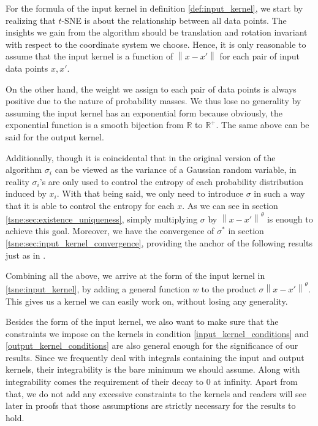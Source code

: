 \documentclass[10pt]{article}
\newcommand{\norm}[1]{\left\lVert#1\right\rVert}
\newenvironment{Proof of lemma}{\noindent{\bf Proof of Lemma}}{\hfill$\Box$\newline}
\newenvironment{Proof of claim}{\noindent{\bf Proof of claim}}{\hfill$\Box$\newline}
\newenvironment{Proof of theorem}{\noindent{\bf Proof of Theorem}}{\hfill\scriptsize{$\Box$}\newline}
\newenvironment{Proof of theorems}{\noindent{\bf Proof of Theorems}}{\hfill$\Box$\newline}
\newenvironment{Proof of proposition}{\noindent{\bf Proof of Proposition}}{\hfill$\Box$\newline}
\newenvironment{Proof of propositions}{\noindent{\bf Proof of Propositions}}{\hfill$\Box$\newline}
\newenvironment{Proof of exercise}{\noindent{\it Proof of Exercise:}}{\hfill$\Box$}
\numberwithin{equation}{section}
\begin{document}
For the formula of the input kernel in definition \ref{def:input_kernel}, we
start by realizing that $t$-SNE is about the relationship between all data
points. The insights we gain from the algorithm should be translation and
rotation invariant with respect to the coordinate system we choose. Hence, it
is only reasonable to assume that the input kernel is a function of
$\norm{x-x'}$ for each pair of input data points $x,x'$.

On the other hand, the weight we assign to each pair of data points is always
positive due to the nature of probability masses. We thus lose no generality by
assuming the input kernel has an exponential form because obviously, the
exponential function is a smooth bijection from $\mathbb{R}$ to $\mathbb{R}^+$.
The same above can be said for the output kernel.

Additionally, though it is coincidental that in the original version of the
algorithm $\sigma_i$ can be viewed as the variance of a Gaussian random
variable, in reality $\sigma_i$'s are only used to control the entropy of each
probability distribution induced by $x_i$. With that being said, we only need
to introduce $\sigma$ in such a way that it is able to control the entropy for
each $x$. As we can see in section \ref{tsne:sec:existence_uniqueness}, simply
multiplying $\sigma$ by $\norm{x-x'}^{\theta}$ is enough to achieve this goal.
Moreover, we have the convergence of $\sigma^*$ in section
\ref{tsne:sec:input_kernel_convergence}, providing the anchor of the following
results just as in \cite{auffinger-tsne}.

Combining all the above, we arrive at the form of the input kernel in
\eqref{tsne:input_kernel}, by adding a general function $w$ to the product
$\sigma \norm{x-x'}^{\theta}$. This gives us a kernel we can easily work on,
without losing any generality.

Besides the form of the input kernel, we also want to make sure that the
constraints we impose on the kernels in condition \ref{input_kernel_conditions}
and \ref{output_kernel_conditions} are also general enough for the significance
of our results. Since we frequently deal with integrals containing the input
and output kernels, their integrability is the bare minimum we should assume.
Along with integrability comes the requirement of their decay to 0 at infinity.
Apart from that, we do not add any excessive constraints to the kernels and
readers will see later in proofs that those assumptions are strictly necessary
for the results to hold.
\end{document}
